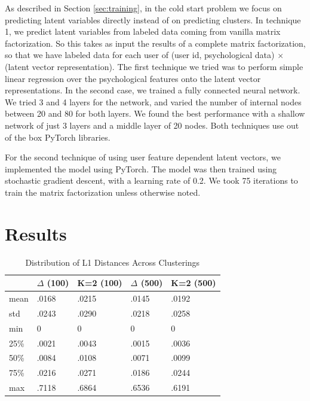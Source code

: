 \documentclass{article}
\begin{document}
As described in Section \ref{sec:training}, in the cold start problem we focus on predicting latent variables directly instead of on predicting clusters. In technique 1, we predict latent variables from labeled data coming from vanilla matrix factorization. So this takes as input the results of a complete matrix factorization, so that we have labeled data for each user of (user id, psychological data) $\times$ (latent vector representation). The first technique we tried was to perform simple linear regression over the psychological features onto the latent vector representations. In the second case, we trained a fully connected neural network. We tried 3 and 4 layers for the network, and varied the number of internal nodes between 20 and 80 for both layers. We found the best performance with a shallow network of just 3 layers and a middle layer of 20 nodes. Both techniques use out of the box PyTorch libraries. 

For the second technique of using user feature dependent latent vectors, we implemented the model using PyTorch. The model was then trained using stochastic gradient descent, with a learning rate of 0.2. We took 75 iterations to train the matrix factorization unless otherwise noted. 

\section{Results}



\begin{table}[t]
\centering
\caption{Distribution of L1 Distances Across Clusterings}
\label{fig:dist}
\begin{tabular}{lllll}
     & $\Delta$ (100) &K=2 (100) & $\Delta$ (500)  & K=2 (500)\\ \hline
\multicolumn{1}{l|}{mean} & .0168         & .0215   & .0145         & .0192   \\
\multicolumn{1}{l|}{std}  & .0243         & .0290   & .0218         & .0258   \\
\multicolumn{1}{l|}{min}  & 0             & 0       & 0             & 0       \\
\multicolumn{1}{l|}{25\%} & .0021         & .0043   & .0015         & .0036   \\
\multicolumn{1}{l|}{50\%} & .0084         & .0108   & .0071         & .0099   \\
\multicolumn{1}{l|}{75\%} & .0216         & .0271   & .0186         & .0244   \\
\multicolumn{1}{l|}{max}  & .7118         & .6864   & .6536         & .6191  
\end{tabular}
\end{table}
\end{document}
